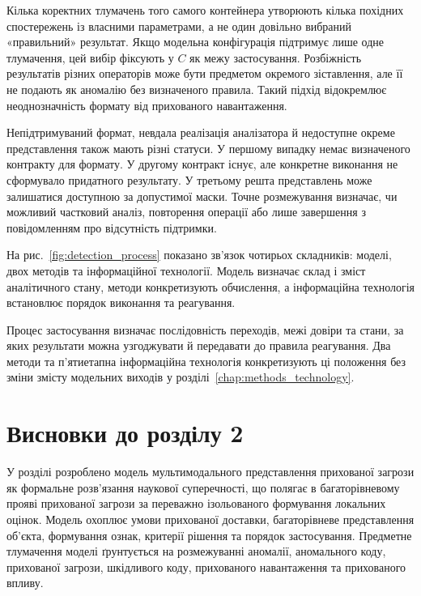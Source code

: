 Кілька коректних тлумачень того самого контейнера утворюють кілька похідних спостережень із власними параметрами, а не один довільно вибраний «правильний» результат. Якщо модельна конфігурація підтримує лише одне тлумачення, цей вибір фіксують у $C$ як межу застосування. Розбіжність результатів різних операторів може бути предметом окремого зіставлення, але її не подають як аномалію без визначеного правила. Такий підхід відокремлює неоднозначність формату від прихованого навантаження.

Непідтримуваний формат, невдала реалізація аналізатора й недоступне окреме представлення також мають різні статуси. У першому випадку немає визначеного контракту для формату. У другому контракт існує, але конкретне виконання не сформувало придатного результату. У третьому решта представлень може залишатися доступною за допустимої маски. Точне розмежування визначає, чи можливий частковий аналіз, повторення операції або лише завершення з повідомленням про відсутність підтримки.

На рис.~\ref{fig:detection_process} показано зв’язок чотирьох складників: моделі, двох методів та інформаційної технології. Модель визначає склад і зміст аналітичного стану, методи конкретизують обчислення, а інформаційна технологія встановлює порядок виконання та реагування.



Процес застосування визначає послідовність переходів, межі довіри та стани, за яких результати можна узгоджувати й передавати до правила реагування. Два методи та п’ятиетапна інформаційна технологія конкретизують ці положення без зміни змісту модельних виходів у розділі~\ref{chap:methods_technology}.

\section*{Висновки до розділу 2}
{}

У розділі розроблено модель мультимодального представлення прихованої загрози як формальне розв’язання наукової суперечності, що полягає в багаторівневому прояві прихованої загрози за переважно ізольованого формування локальних оцінок. Модель охоплює умови прихованої доставки, багаторівневе представлення об’єкта, формування ознак, критерії рішення та порядок застосування. Предметне тлумачення моделі ґрунтується на розмежуванні аномалії, аномального коду, прихованої загрози, шкідливого коду, прихованого навантаження та прихованого впливу.

